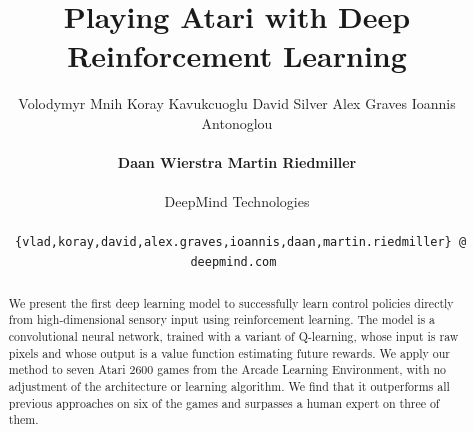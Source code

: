\documentclass{article} %
\title{Playing Atari with Deep Reinforcement Learning}
\author{
Volodymyr Mnih \hspace{0.3cm}
Koray Kavukcuoglu \hspace{0.3cm}
David Silver \hspace{0.3cm}
Alex Graves \hspace{0.3cm} 
Ioannis Antonoglou\\
\\
{\bf Daan Wierstra \hspace{0.3cm}
Martin Riedmiller}\\
\\
DeepMind Technologies\\
\\
\small{\texttt{ \{vlad,koray,david,alex.graves,ioannis,daan,martin.riedmiller\} @ deepmind.com }}
}
\begin{document}
\maketitle

\begin{abstract}

We present the first deep learning model to successfully learn control policies directly from high-dimensional sensory input using reinforcement learning. 
The model is a convolutional neural network, trained with a variant of Q-learning, whose input is raw pixels and whose output is a value function estimating future rewards.
We apply our method to seven Atari 2600 games from the Arcade Learning Environment, with no adjustment of the architecture or learning algorithm.
We find that it outperforms all previous approaches on six of the games and surpasses a human expert on three of them.
% 
% 

\end{abstract}

\newcommand{\ssq}{s^{(t)}}
\newcommand{\asq}{a^{(t)}}
\newcommand{\pasq}{a^{(t-1)}}
\newcommand{\stpn}{s_{t+1}}
\newcommand{\qpi}{Q^{\pi}\left(\ssq,a_t\right)}
\newcommand{\vpi}{V^{\pi}\left(\ssq\right)}
\newcommand{\aqpi}{\hat{Q}^{\pi}}
\end{document}
